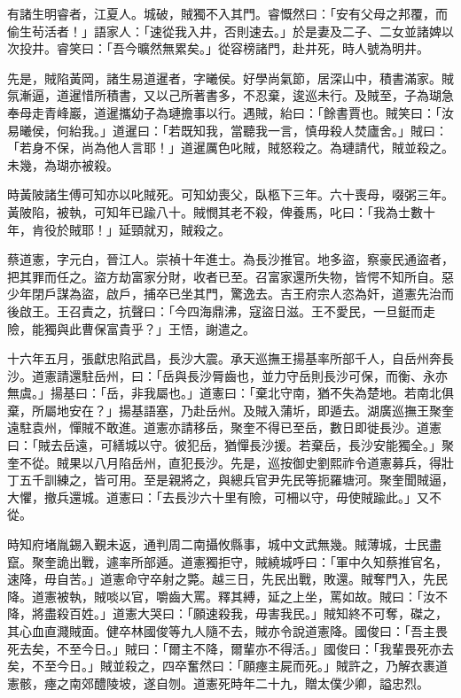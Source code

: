 \begin{pinyinscope}
有諸生明睿者，江夏人。城破，賊獨不入其門。睿慨然曰：「安有父母之邦覆，而偷生茍活者！」語家人：「速從我入井，否則速去。」於是妻及二子、二女並諸婢以次投井。睿笑曰：「吾今曠然無累矣。」從容榜諸門，赴井死，時人號為明井。

先是，賊陷黃岡，諸生易道暹者，字曦侯。好學尚氣節，居深山中，積書滿家。賊氛漸逼，道暹惜所積書，又以己所著書多，不忍棄，逡巡未行。及賊至，子為瑚急奉母走青峰巖，道暹攜幼子為璉擔事以行。遇賊，紿曰：「餘書賈也。賊笑曰：「汝易曦侯，何紿我。」道暹曰：「若既知我，當聽我一言，慎毋殺人焚廬舍。」賊曰：「若身不保，尚為他人言耶！」道暹厲色叱賊，賊怒殺之。為璉請代，賊並殺之。未幾，為瑚亦被殺。

時黃陂諸生傅可知亦以叱賊死。可知幼喪父，臥柩下三年。六十喪母，啜粥三年。黃陂陷，被執，可知年已踰八十。賊憫其老不殺，俾養馬，叱曰：「我為士數十年，肯役於賊耶！」延頸就刃，賊殺之。

蔡道憲，字元白，晉江人。崇禎十年進士。為長沙推官。地多盜，察豪民通盜者，把其罪而任之。盜方劫富家分財，收者已至。召富家還所失物，皆愕不知所自。惡少年閉戶謀為盜，啟戶，捕卒已坐其門，驚逸去。吉王府宗人恣為奸，道憲先治而後啟王。王召責之，抗聲曰：「今四海鼎沸，寇盜日滋。王不愛民，一旦鋌而走險，能獨與此曹保富貴乎？」王悟，謝遣之。

十六年五月，張獻忠陷武昌，長沙大震。承天巡撫王揚基率所部千人，自岳州奔長沙。道憲請還駐岳州，曰：「岳與長沙脣齒也，並力守岳則長沙可保，而衡、永亦無虞。」揚基曰：「岳，非我屬也。」道憲曰：「棄北守南，猶不失為楚地。若南北俱棄，所屬地安在？」揚基語塞，乃赴岳州。及賊入蒲圻，即遁去。湖廣巡撫王聚奎遠駐袁州，憚賊不敢進。道憲亦請移岳，聚奎不得已至岳，數日即徙長沙。道憲曰：「賊去岳遠，可繕城以守。彼犯岳，猶憚長沙援。若棄岳，長沙安能獨全。」聚奎不從。賊果以八月陷岳州，直犯長沙。先是，巡按御史劉熙祚令道憲募兵，得壯丁五千訓練之，皆可用。至是親將之，與總兵官尹先民等扼羅塘河。聚奎聞賊逼，大懼，撤兵還城。道憲曰：「去長沙六十里有險，可柵以守，毋使賊踰此。」又不從。

時知府堵胤錫入覲未返，通判周二南攝攸縣事，城中文武無幾。賊薄城，士民盡竄。聚奎詭出戰，遽率所部遁。道憲獨拒守，賊繞城呼曰：「軍中久知蔡推官名，速降，毋自苦。」道憲命守卒射之斃。越三日，先民出戰，敗還。賊奪門入，先民降。道憲被執，賊啖以官，嚼齒大罵。釋其縛，延之上坐，罵如故。賊曰：「汝不降，將盡殺百姓。」道憲大哭曰：「願速殺我，毋害我民。」賊知終不可奪，磔之，其心血直濺賊面。健卒林國俊等九人隨不去，賊亦令說道憲降。國俊曰：「吾主畏死去矣，不至今日。」賊曰：「爾主不降，爾輩亦不得活。」國俊曰：「我輩畏死亦去矣，不至今日。」賊並殺之，四卒奮然曰：「願瘞主屍而死。」賊許之，乃解衣裹道憲骸，瘞之南郊醴陵坡，遂自刎。道憲死時年二十九，贈太僕少卿，謚忠烈。


\end{pinyinscope}
